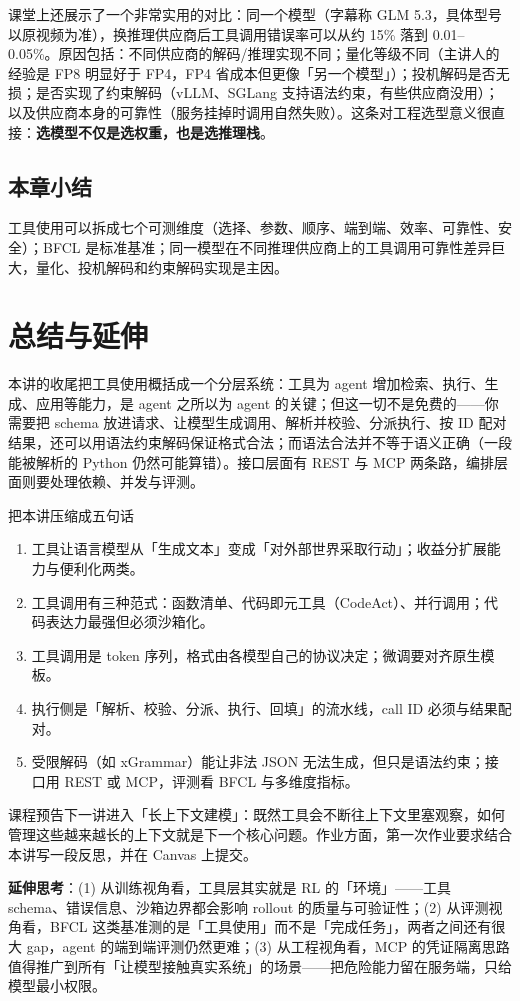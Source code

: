 \documentclass[a4paper]{article}
\begin{document}
课堂上还展示了一个非常实用的对比：同一个模型（字幕称 GLM 5.3，具体型号以原视频为准），换推理供应商后工具调用错误率可以从约 15\% 落到 0.01--0.05\%。原因包括：不同供应商的解码/推理实现不同；量化等级不同（主讲人的经验是 FP8 明显好于 FP4，FP4 省成本但更像「另一个模型」）；投机解码是否无损；是否实现了约束解码（vLLM、SGLang 支持语法约束，有些供应商没用）；以及供应商本身的可靠性（服务挂掉时调用自然失败）。这条对工程选型意义很直接：\textbf{选模型不仅是选权重，也是选推理栈}。

\subsection{本章小结}
工具使用可以拆成七个可测维度（选择、参数、顺序、端到端、效率、可靠性、安全）；BFCL 是标准基准；同一模型在不同推理供应商上的工具调用可靠性差异巨大，量化、投机解码和约束解码实现是主因。

\section{总结与延伸}

本讲的收尾把工具使用概括成一个分层系统：工具为 agent 增加检索、执行、生成、应用等能力，是 agent 之所以为 agent 的关键；但这一切不是免费的——你需要把 schema 放进请求、让模型生成调用、解析并校验、分派执行、按 ID 配对结果，还可以用语法约束解码保证格式合法；而语法合法并不等于语义正确（一段能被解析的 Python 仍然可能算错）。接口层面有 REST 与 MCP 两条路，编排层面则要处理依赖、并发与评测。

\begin{importantbox}{把本讲压缩成五句话}
\begin{enumerate}
\item 工具让语言模型从「生成文本」变成「对外部世界采取行动」；收益分扩展能力与便利化两类。
\item 工具调用有三种范式：函数清单、代码即元工具（CodeAct）、并行调用；代码表达力最强但必须沙箱化。
\item 工具调用是 token 序列，格式由各模型自己的协议决定；微调要对齐原生模板。
\item 执行侧是「解析、校验、分派、执行、回填」的流水线，call ID 必须与结果配对。
\item 受限解码（如 xGrammar）能让非法 JSON 无法生成，但只是语法约束；接口用 REST 或 MCP，评测看 BFCL 与多维度指标。
\end{enumerate}
\end{importantbox}

课程预告下一讲进入「长上下文建模」：既然工具会不断往上下文里塞观察，如何管理这些越来越长的上下文就是下一个核心问题。作业方面，第一次作业要求结合本讲写一段反思，并在 Canvas 上提交。

\textbf{延伸思考}：(1) 从训练视角看，工具层其实就是 RL 的「环境」——工具 schema、错误信息、沙箱边界都会影响 rollout 的质量与可验证性；(2) 从评测视角看，BFCL 这类基准测的是「工具使用」而不是「完成任务」，两者之间还有很大 gap，agent 的端到端评测仍然更难；(3) 从工程视角看，MCP 的凭证隔离思路值得推广到所有「让模型接触真实系统」的场景——把危险能力留在服务端，只给模型最小权限。
\end{document}
